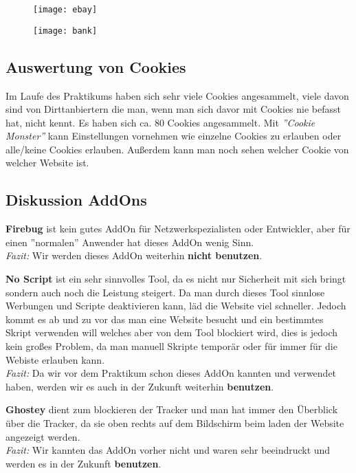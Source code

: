 \documentclass{scrartcl}
\begin{document}
  \begin{figure}
  \texttt{[image: ebay]}
  \label{fig : ebay}
  \end{figure}
  
  \begin{figure}
  \texttt{[image: bank]}
  \label{fig:bank}
  \end{figure}
  
  \subsection[Aufgabe 10 Auswertung von Cookies]{Auswertung von Cookies}
  
  Im Laufe des Praktikums haben sich sehr viele Cookies angesammelt, viele davon sind von Dirttanbiertern die man, wenn man sich davor mit Cookies nie befasst hat, nicht kennt. Es haben sich ca. 80 Cookies angesammelt. 
  Mit \textit{''Cookie Monster''} kann Einstellungen vornehmen wie einzelne Cookies zu erlauben oder alle/keine Cookies erlauben. Außerdem kann man noch sehen welcher Cookie von welcher Website ist.
  
  \subsection[Aufgabe 11 Diskussion AddOns]{Diskussion AddOns}
  
  \textbf{Firebug} ist kein gutes AddOn für Netzwerkspezialisten oder Entwickler, aber für einen ''normalen'' Anwender hat dieses AddOn wenig Sinn.\\ 
  \emph{Fazit:} Wir werden dieses AddOn weiterhin \textbf{nicht benutzen}.
  
  \textbf{No Script} ist ein sehr sinnvolles Tool, da es nicht nur Sicherheit mit sich bringt sondern auch noch die Leistung steigert. Da man durch dieses Tool sinnlose Werbungen und Scripte deaktivieren kann, läd die Website viel schneller. Jedoch kommt es ab und zu vor das man eine Website besucht und ein bestimmtes Skript verwenden will welches aber von dem Tool blockiert wird, dies is jedoch kein großes Problem, da man manuell Skripte temporär oder für immer für die Webiste erlauben kann. \\
  \emph{Fazit:} Da wir vor dem Praktikum schon dieses AddOn kannten und verwendet haben, werden wir es auch in der Zukunft weiterhin \textbf{benutzen}.
  
  \textbf{Ghostey} dient zum blockieren der Tracker und man hat immer den Überblick über die Tracker, da sie oben rechts auf dem Bildschirm beim laden der Website angezeigt werden.\\
  \emph{Fazit:} Wir kannten das AddOn vorher nicht und waren sehr beeindruckt und werden es in der Zukunft \textbf{benutzen}.
  
\end{document}
